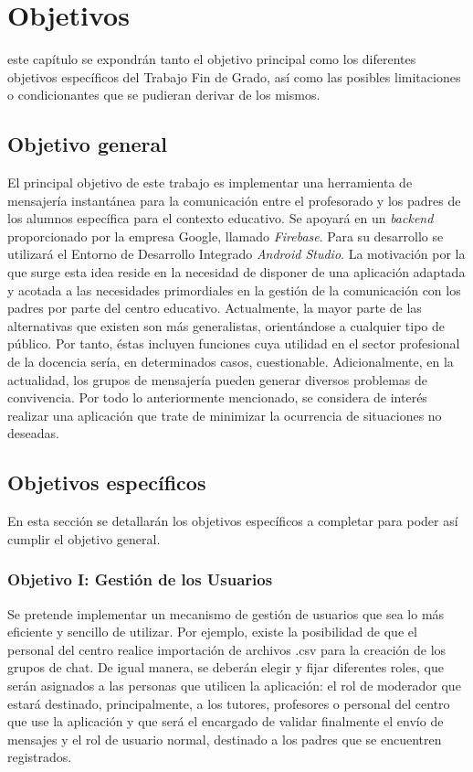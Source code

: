 \chapter{Objetivos}
\label{chap:objetivos}

\noindent

 este capítulo se expondrán tanto el objetivo principal como los diferentes objetivos específicos del Trabajo Fin de Grado, así como las posibles limitaciones o condicionantes que se pudieran derivar de los mismos.

\section{Objetivo general}
El principal objetivo de este trabajo es implementar una herramienta de mensajería instantánea para la comunicación entre el profesorado y los padres de los alumnos específica para el contexto educativo. Se apoyará en un \textit{backend} proporcionado por la empresa Google, llamado \textit{Firebase}. Para su desarrollo se utilizará el Entorno de Desarrollo Integrado \textit{Android Studio}. La motivación por la que surge esta idea reside en la necesidad de disponer de una aplicación adaptada y acotada a las necesidades primordiales en la gestión de la comunicación con los padres por parte del centro educativo. Actualmente, la mayor parte de las alternativas que existen son más generalistas, orientándose a cualquier tipo de público. Por tanto, éstas incluyen funciones cuya utilidad en el sector profesional de la docencia sería, en determinados casos, cuestionable. Adicionalmente, en la actualidad, los grupos de mensajería pueden generar diversos problemas de convivencia. Por todo lo anteriormente mencionado, se considera de interés realizar una aplicación que trate de minimizar la ocurrencia de situaciones no deseadas.

\section{Objetivos específicos}
En esta sección se detallarán los objetivos específicos a completar para poder así cumplir el objetivo general.

\newpage

\subsection{Objetivo I: Gestión de los Usuarios}
Se pretende implementar un mecanismo de gestión de usuarios que sea lo más eficiente y sencillo de utilizar. Por ejemplo, existe la posibilidad de que el personal del centro realice importación de archivos .csv para la creación de los grupos de chat. De igual manera, se deberán elegir y fijar diferentes roles, que serán asignados a las personas que utilicen la aplicación: el rol de moderador que estará destinado, principalmente, a los tutores, profesores o personal del centro que use la aplicación y que será el encargado de validar finalmente el envío de mensajes y el rol de usuario normal, destinado a los padres que se encuentren registrados.

